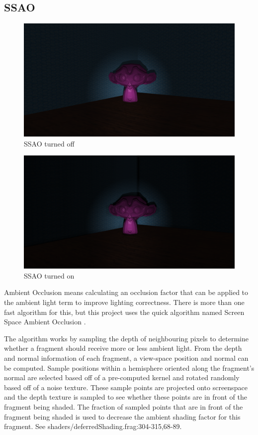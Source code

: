\documentclass[oneside]{book}
\begin{document}
    \subsection{SSAO} \label{ssao}
      \begin{figure}[h!]
        \centering
        \includegraphics[width=1.0\textwidth]{nossao}
        \caption{SSAO turned off}
      \end{figure}

      \begin{figure}[h!]
        \centering
        \includegraphics[width=1.0\textwidth]{ssao}
        \caption{SSAO turned on}
      \end{figure}

      Ambient Occlusion means calculating an occlusion factor that can be applied to the ambient light term to improve lighting correctness. There is more than one fast algorithm for this, but this project uses the quick algorithm named Screen Space Ambient Occlusion \cite{kajalinshaderx7}\cite{mittring2007finding}.

      The algorithm works by sampling the depth of neighbouring pixels to determine whether a fragment should receive more or less ambient light. From the depth and normal information of each fragment, a view-space position and normal can be computed. Sample positions within a hemisphere oriented along the fragment's normal are selected based off of a pre-computed kernel and rotated randomly based off of a noise texture. These sample points are projected onto screenspace and the depth texture is sampled to see whether these points are in front of the fragment being shaded. The fraction of sampled points that are in front of the fragment being shaded is used to decrease the ambient shading factor for this fragment. See shaders/deferredShading.frag:304-315,68-89.
\end{document}
